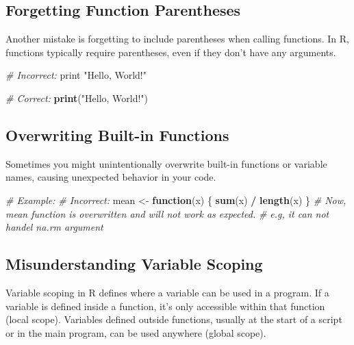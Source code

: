 \documentclass[
]{book}
\newenvironment{Shaded}{\begin{snugshade}}{\end{snugshade}}
\newcommand{\CommentTok}[1]{\textcolor[rgb]{0.56,0.35,0.01}{\textit{#1}}}
\newcommand{\ControlFlowTok}[1]{\textcolor[rgb]{0.13,0.29,0.53}{\textbf{#1}}}
\newcommand{\FunctionTok}[1]{\textcolor[rgb]{0.13,0.29,0.53}{\textbf{#1}}}
\newcommand{\NormalTok}[1]{#1}
\newcommand{\OtherTok}[1]{\textcolor[rgb]{0.56,0.35,0.01}{#1}}
\newcommand{\SpecialCharTok}[1]{\textcolor[rgb]{0.81,0.36,0.00}{\textbf{#1}}}
\newcommand{\StringTok}[1]{\textcolor[rgb]{0.31,0.60,0.02}{#1}}
\begin{document}
\hypertarget{forgetting-function-parentheses}{%
\subsection{Forgetting Function Parentheses}\label{forgetting-function-parentheses}}

Another mistake is forgetting to include parentheses when calling functions. In R, functions typically require parentheses, even if they don't have any arguments.

\begin{Shaded}
\begin{Highlighting}[]
\CommentTok{\# Incorrect:}
\NormalTok{print }\StringTok{"Hello, World!"}

\CommentTok{\# Correct:}
\FunctionTok{print}\NormalTok{(}\StringTok{"Hello, World!"}\NormalTok{)}
\end{Highlighting}
\end{Shaded}

\hypertarget{overwriting-built-in-functions}{%
\subsection{Overwriting Built-in Functions}\label{overwriting-built-in-functions}}

Sometimes you might unintentionally overwrite built-in functions or variable names, causing unexpected behavior in your code.

\begin{Shaded}
\begin{Highlighting}[]
\CommentTok{\# Example:}
\CommentTok{\# Incorrect:}
\NormalTok{mean }\OtherTok{\textless{}{-}} \ControlFlowTok{function}\NormalTok{(x) \{}
  \FunctionTok{sum}\NormalTok{(x) }\SpecialCharTok{/} \FunctionTok{length}\NormalTok{(x)}
\NormalTok{\}}
\CommentTok{\# Now, mean function is overwritten and will not work as expected.}
\CommentTok{\# e.g, it can not handel na.rm argument }
\end{Highlighting}
\end{Shaded}

\hypertarget{misunderstanding-variable-scoping}{%
\subsection{Misunderstanding Variable Scoping}\label{misunderstanding-variable-scoping}}

Variable scoping in R defines where a variable can be used in a program. If a variable is defined inside a function, it's only accessible within that function (local scope). Variables defined outside functions, usually at the start of a script or in the main program, can be used anywhere (global scope).
\end{document}
